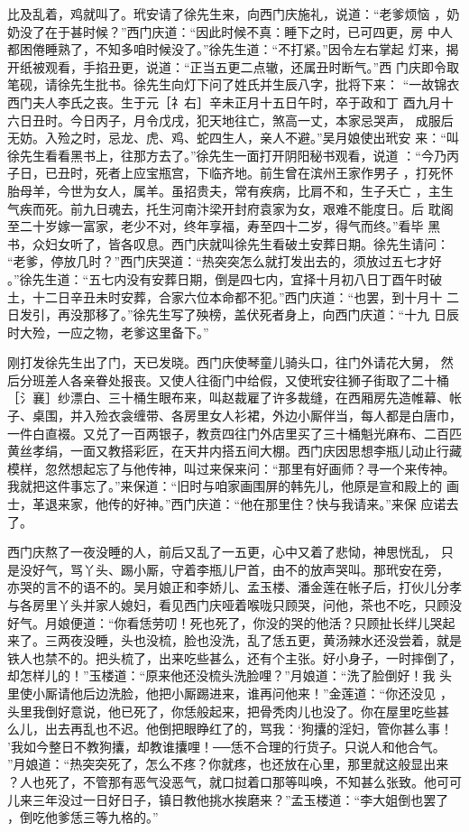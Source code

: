 比及乱着，鸡就叫了。玳安请了徐先生来，向西门庆施礼，说道：“老爹烦恼
，奶奶没了在于甚时候？”西门庆道：“因此时候不真：睡下之时，已可四更，房
中人都困倦睡熟了，不知多咱时候没了。”徐先生道：“不打紧。”因令左右掌起
灯来，揭开纸被观看，手掐丑更，说道：“正当五更二点辙，还属丑时断气。”西
门庆即令取笔砚，请徐先生批书。徐先生向灯下问了姓氏并生辰八字，批将下来：
“一故锦衣西门夫人李氏之丧。生于元［礻右］辛未正月十五日午时，卒于政和丁
酉九月十六日丑时。今日丙子，月令戊戌，犯天地往亡，煞高一丈，本家忌哭声，
成服后无妨。入殓之时，忌龙、虎、鸡、蛇四生人，亲人不避。”吴月娘使出玳安
来：“叫徐先生看看黑书上，往那方去了。”徐先生一面打开阴阳秘书观看，说道
：“今乃丙子日，已丑时，死者上应宝瓶宫，下临齐地。前生曾在滨州王家作男子
，打死怀胎母羊，今世为女人，属羊。虽招贵夫，常有疾病，比肩不和，生子夭亡
，主生气疾而死。前九日魂去，托生河南汴梁开封府袁家为女，艰难不能度日。后
耽阁至二十岁嫁一富家，老少不对，终年享福，寿至四十二岁，得气而终。”看毕
黑书，众妇女听了，皆各叹息。西门庆就叫徐先生看破土安葬日期。徐先生请问：
“老爹，停放几时？”西门庆哭道：“热突突怎么就打发出去的，须放过五七才好
。”徐先生道：“五七内没有安葬日期，倒是四七内，宜择十月初八日丁酉午时破
土，十二日辛丑未时安葬，合家六位本命都不犯。”西门庆道：“也罢，到十月十
二日发引，再没那移了。”徐先生写了殃榜，盖伏死者身上，向西门庆道：“十九
日辰时大殓，一应之物，老爹这里备下。”

刚打发徐先生出了门，天已发晓。西门庆使琴童儿骑头口，往门外请花大舅，
然后分班差人各亲眷处报丧。又使人往衙门中给假，又使玳安往狮子街取了二十桶
［氵襄］纱漂白、三十桶生眼布来，叫赵裁雇了许多裁缝，在西厢房先造帷幕、帐
子、桌围，并入殓衣衾缠带、各房里女人衫裙，外边小厮伴当，每人都是白唐巾，
一件白直裰。又兑了一百两银子，教贲四往门外店里买了三十桶魁光麻布、二百匹
黄丝孝绢，一面又教搭彩匠，在天井内搭五间大棚。西门庆因思想李瓶儿动止行藏
模样，忽然想起忘了与他传神，叫过来保来问：“那里有好画师？寻一个来传神。
我就把这件事忘了。”来保道：“旧时与咱家画围屏的韩先儿，他原是宣和殿上的
画士，革退来家，他传的好神。”西门庆道：“他在那里住？快与我请来。”来保
应诺去了。

西门庆熬了一夜没睡的人，前后又乱了一五更，心中又着了悲恸，神思恍乱，
只是没好气，骂丫头、踢小厮，守着李瓶儿尸首，由不的放声哭叫。那玳安在旁，
亦哭的言不的语不的。吴月娘正和李娇儿、孟玉楼、潘金莲在帐子后，打伙儿分孝
与各房里丫头并家人媳妇，看见西门庆哑着喉咙只顾哭，问他，茶也不吃，只顾没
好气。月娘便道：“你看恁劳叨！死也死了，你没的哭的他活？只顾扯长绊儿哭起
来了。三两夜没睡，头也没梳，脸也没洗，乱了恁五更，黄汤辣水还没尝着，就是
铁人也禁不的。把头梳了，出来吃些甚么，还有个主张。好小身子，一时摔倒了，
却怎样儿的！”玉楼道：“原来他还没梳头洗脸哩？”月娘道：“洗了脸倒好！我
头里使小厮请他后边洗脸，他把小厮踢进来，谁再问他来！”金莲道：“你还没见
，头里我倒好意说，他已死了，你恁般起来，把骨秃肉儿也没了。你在屋里吃些甚
么儿，出去再乱也不迟。他倒把眼睁红了的，骂我：‘狗攮的淫妇，管你甚么事！
’我如今整日不教狗攮，却教谁攮哩！──恁不合理的行货子。只说人和他合气。
”月娘道：“热突突死了，怎么不疼？你就疼，也还放在心里，那里就这般显出来
？人也死了，不管那有恶气没恶气，就口挝着口那等叫唤，不知甚么张致。他可可
儿来三年没过一日好日子，镇日教他挑水挨磨来？”孟玉楼道：“李大姐倒也罢了
，倒吃他爹恁三等九格的。”

